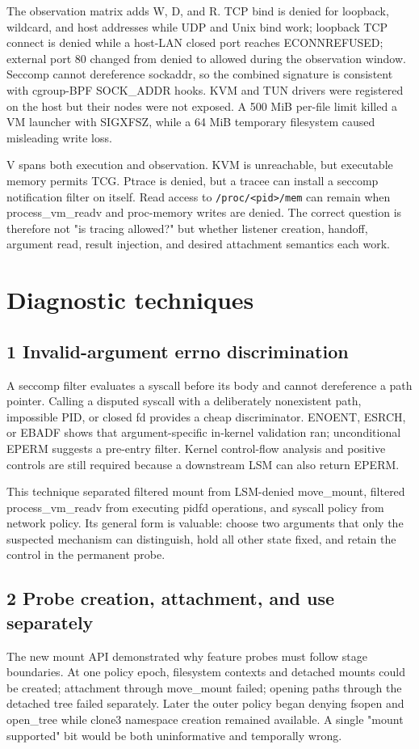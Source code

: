 \documentclass[10pt,twocolumn]{article}
\begin{document}
The observation matrix adds W, D, and R. TCP bind is denied for loopback, wildcard, and host addresses while UDP and Unix bind work; loopback TCP connect is denied while a host-LAN closed port reaches ECONNREFUSED; external port 80 changed from denied to allowed during the observation window. Seccomp cannot dereference sockaddr, so the combined signature is consistent with cgroup-BPF SOCK\_ADDR hooks. KVM and TUN drivers were registered on the host but their nodes were not exposed. A 500 MiB per-file limit killed a VM launcher with SIGXFSZ, while a 64 MiB temporary filesystem caused misleading write loss.

V spans both execution and observation. KVM is unreachable, but executable memory permits TCG. Ptrace is denied, but a tracee can install a seccomp notification filter on itself. Read access to \texttt{/proc/<pid>/mem} can remain when process\_vm\_readv and proc-memory writes are denied. The correct question is therefore not "is tracing allowed?" but whether listener creation, handoff, argument read, result injection, and desired attachment semantics each work.

\section{Diagnostic techniques}
\subsection{1 Invalid-argument errno discrimination}
A seccomp filter evaluates a syscall before its body and cannot dereference a path pointer. Calling a disputed syscall with a deliberately nonexistent path, impossible PID, or closed fd provides a cheap discriminator. ENOENT, ESRCH, or EBADF shows that argument-specific in-kernel validation ran; unconditional EPERM suggests a pre-entry filter. Kernel control-flow analysis and positive controls are still required because a downstream LSM can also return EPERM.

This technique separated filtered mount from LSM-denied move\_mount, filtered process\_vm\_readv from executing pidfd operations, and syscall policy from network policy. Its general form is valuable: choose two arguments that only the suspected mechanism can distinguish, hold all other state fixed, and retain the control in the permanent probe.

\subsection{2 Probe creation, attachment, and use separately}
The new mount API demonstrated why feature probes must follow stage boundaries. At one policy epoch, filesystem contexts and detached mounts could be created; attachment through move\_mount failed; opening paths through the detached tree failed separately. Later the outer policy began denying fsopen and open\_tree while clone3 namespace creation remained available. A single "mount supported" bit would be both uninformative and temporally wrong.
\end{document}

